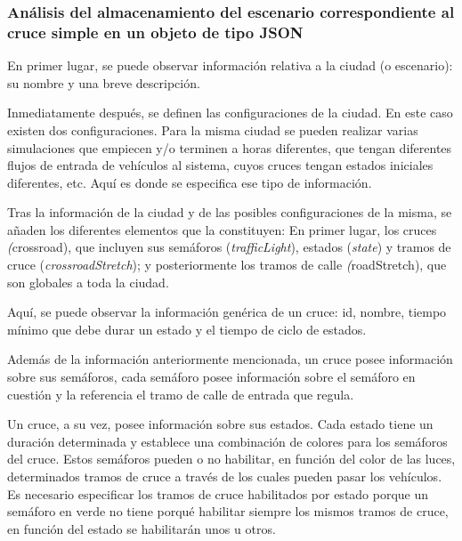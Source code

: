 \subsubsection{Análisis del almacenamiento del escenario correspondiente al cruce simple en un objeto de tipo JSON}
En primer lugar, se puede observar información relativa a la ciudad (o escenario): su nombre y una breve descripción.


Inmediatamente después, se definen las configuraciones de la ciudad. En este caso existen dos configuraciones. 
Para la misma ciudad se pueden realizar varias simulaciones que empiecen y/o terminen a horas diferentes, que tengan diferentes flujos de entrada de vehículos al sistema, cuyos cruces tengan estados iniciales diferentes, etc. Aquí es donde se especifica ese tipo de información.


Tras la información de la ciudad y de las posibles configuraciones de la misma, se añaden los diferentes elementos que la constituyen: En primer lugar, los cruces \textit({crossroad}), que incluyen sus semáforos (\textit{trafficLight}), estados (\textit{state}) y tramos de cruce (\textit{crossroadStretch}); y posteriormente los tramos de calle \textit({roadStretch}), que son globales a toda la ciudad.

Aquí, se puede observar la información genérica de un cruce: id, nombre, tiempo mínimo que debe durar un estado y el tiempo de ciclo de estados.


Además de la información anteriormente mencionada, un cruce posee información sobre sus semáforos, cada semáforo posee información sobre el semáforo en cuestión y la referencia el tramo de calle de entrada que regula.


Un cruce, a su vez, posee información sobre sus estados. Cada estado tiene un duración determinada y establece una combinación de colores para los semáforos del cruce. Estos semáforos pueden o no habilitar, en función del color de las luces, determinados tramos de cruce a través de los cuales pueden pasar los vehículos. Es necesario especificar los tramos de cruce habilitados por estado porque un semáforo en verde no tiene porqué habilitar siempre los mismos tramos de cruce, en función del estado se habilitarán unos u otros.


